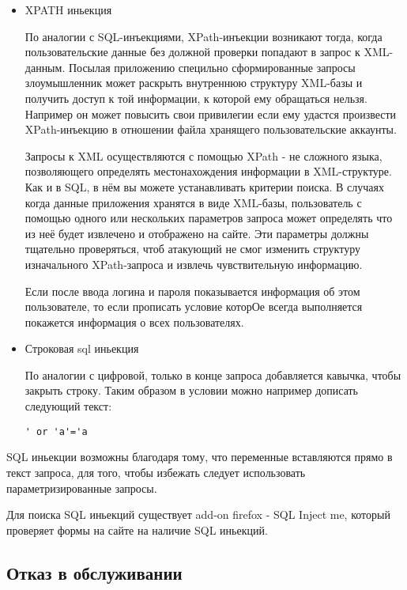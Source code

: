 \documentclass[11pt, a4paper]{article}		%
\begin{document}
\begin{itemize}
\item XPATH иньекция

По аналогии с SQL-инъекциями, XPath-инъекции возникают тогда, когда пользовательские
данные без должной проверки попадают в запрос к XML-данным. Посылая приложению
специльно сформированные запросы злоумышленник может раскрыть внутреннюю структуру
XML-базы и получить доступ к той информации, к которой ему обращаться нельзя.
Например он может повысить свои привилегии если ему удастся
произвести XPath-инъекцию в отношении файла хранящего пользовательские аккаунты.

Запросы к XML осуществляются с помощью XPath - не сложного языка, позволяющего
определять местонахождения информации в XML-структуре. Как и в SQL, в нём вы можете
устанавливать критерии поиска. В случаях когда данные приложения хранятся в виде XML-базы,
пользователь с помощью одного или нескольких параметров запроса может определять что из неё будет
извлечено и отображено на сайте. Эти параметры должны тщательно проверяться, чтоб атакующий
не смог изменить структуру изначального XPath-запроса и извлечь чувствительную информацию.

Если после ввода логина и пароля показывается информация об этом пользователе, то если прописать условие которОе всегда выполняется покажется информация о всех пользователях.

\item Строковая sql иньекция

По аналогии с цифровой, только в конце запроса добавляется кавычка, чтобы закрыть строку. Таким образом в условии можно например дописать следующий текст:

\begin{verbatim}
' or 'a'='a
\end{verbatim}

\end{itemize}

SQL иньекции возможны благодаря тому, что переменные вставляются прямо в текст запроса, для того, чтобы избежать следует использовать параметризированные запросы.

Для поиска SQL иньекций существует add-on firefox - SQL Inject me, который проверяет формы на сайте на наличие SQL иньекций.



\subsection{Отказ в обслуживании}
\end{document}
